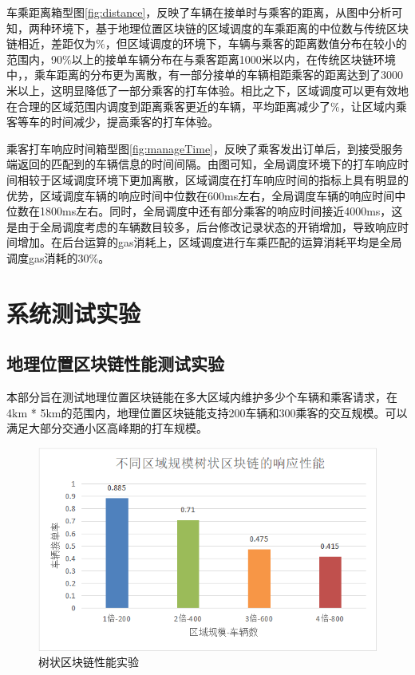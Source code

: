 车乘距离箱型图\ref{fig:distance}，反映了车辆在接单时与乘客的距离，从图中分析可知，两种环境下，基于地理位置区块链的区域调度的车乘距离的中位数与传统区块链相近，差距仅为$\%$，但区域调度的环境下，车辆与乘客的距离数值分布在较小的范围内，90$\%$以上的接单车辆分布在与乘客距离1000米以内，在传统区块链环境中，，乘车距离的分布更为离散，有一部分接单的车辆相距乘客的距离达到了3000米以上，这明显降低了一部分乘客的打车体验。相比之下，区域调度可以更有效地在合理的区域范围内调度到距离乘客更近的车辆，平均距离减少了$\%$，让区域内乘客等车的时间减少，提高乘客的打车体验。

乘客打车响应时间箱型图\ref{fig:manageTime}，反映了乘客发出订单后，到接受服务端返回的匹配到的车辆信息的时间间隔。由图可知，全局调度环境下的打车响应时间相较于区域调度环境下更加离散，区域调度在打车响应时间的指标上具有明显的优势，区域调度车辆的响应时间中位数在600ms左右，全局调度车辆的响应时间中位数在1800ms左右。同时，全局调度中还有部分乘客的响应时间接近4000ms，这是由于全局调度考虑的车辆数目较多，后台修改记录状态的开销增加，导致响应时间增加。在后台运算的gas消耗上，区域调度进行车乘匹配的运算消耗平均是全局调度gas消耗的30$\%$。

\section{系统测试实验}
\subsection{地理位置区块链性能测试实验}
本部分旨在测试地理位置区块链能在多大区域内维护多少个车辆和乘客请求，在4km * 5km的范围内，地理位置区块链能支持200车辆和300乘客的交互规模。可以满足大部分交通小区高峰期的打车规模。

\begin{figure}
  \centering
  \includegraphics[width=1.0\textwidth]{figures/treeBlockchcainPerformance}
  \caption{树状区块链性能实验}\label{fig:treeBlockchcainPerformance}
\end{figure}

